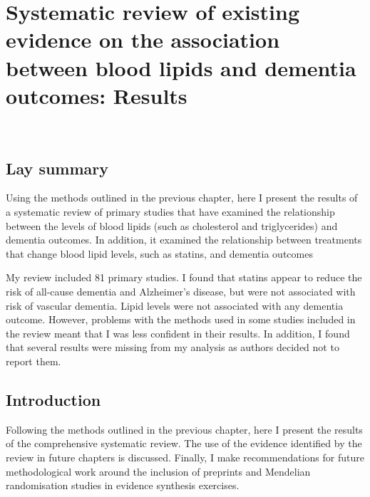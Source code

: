 \documentclass[a4paper, twoside]{templates/ociamthesis}
\begin{document}
\hypertarget{sys-rev-results-heading}{%
\chapter{Systematic review of existing evidence on the association between blood lipids and dementia outcomes: Results}\label{sys-rev-results-heading}}

~

\minitoc 

\begin{laybox}

\hypertarget{lay-summary-3}{%
\section*{Lay summary}\label{lay-summary-3}}

Using the methods outlined in the previous chapter, here I present the results of a systematic review of primary studies that have examined the relationship between the levels of blood lipids (such as cholesterol and triglycerides) and dementia outcomes. In addition, it examined the relationship between treatments that change blood lipid levels, such as statins, and dementia outcomes

My review included 81 primary studies. I found that statins appear to reduce the risk of all-cause dementia and Alzheimer's disease, but were not associated with risk of vascular dementia. Lipid levels were not associated with any dementia outcome. However, problems with the methods used in some studies included in the review meant that I was less confident in their results. In addition, I found that several results were missing from my analysis as authors decided not to report them.

\end{laybox}

\hypertarget{introduction-1}{%
\section{Introduction}\label{introduction-1}}

Following the methods outlined in the previous chapter, here I present the results of the comprehensive systematic review. The use of the evidence identified by the review in future chapters is discussed. Finally, I make recommendations for future methodological work around the inclusion of preprints and Mendelian randomisation studies in evidence synthesis exercises.
\end{document}
